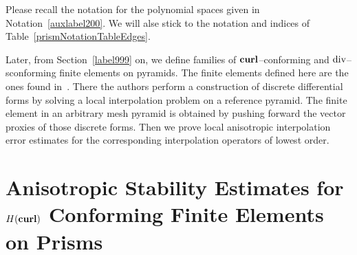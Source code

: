 Please recall 
the notation for the polynomial spaces given in Notation~\ref{auxlabel200}. We 
will alse stick to the notation and indices of 
Table~\ref{prismNotationTableEdges}.

Later, from Section~\ref{label999} on, we define families of
$\textbf{curl}$--conforming and $\operatorname{\textrm{div}}$-- sconforming finite elements on pyramids.
The finite elements defined here 
are the ones found in~\cite{gh99}. There the authors
perform a
construction of discrete differential
forms by solving a local interpolation problem on a reference pyramid. The
finite element in an arbitrary mesh pyramid is obtained by pushing forward
the vector proxies of those discrete forms.
Then we prove local anisotropic interpolation error estimates for the
corresponding interpolation operators of lowest order.

\section{An\-iso\-tropic Stability Estimates for $H(\textbf{curl})$ Conforming Finite
Elements on Prisms}
\label{stab_edge_prism}




